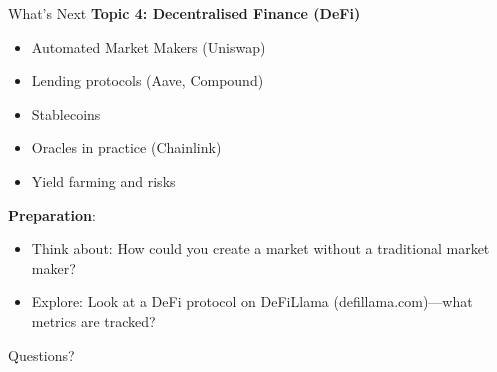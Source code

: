 \documentclass[10pt]{beamer}
\begin{document}
\begin{frame}{What's Next}
  \textbf{Topic 4: Decentralised Finance (DeFi)}
  \begin{itemize}
    \item Automated Market Makers (Uniswap)
    \item Lending protocols (Aave, Compound)
    \item Stablecoins
    \item Oracles in practice (Chainlink)
    \item Yield farming and risks
  \end{itemize}
  
  \vspace{1em}
  \textbf{Preparation}:
  \begin{itemize}
    \item Think about: How could you create a market without a traditional market maker?
    \item Explore: Look at a DeFi protocol on DeFiLlama (defillama.com)---what metrics are tracked?
  \end{itemize}
\end{frame}

\begin{frame}[plain]
  \vfill
  \begin{center}
    {\Large Questions?}
  \end{center}
  \vfill
\end{frame}
\end{document}
